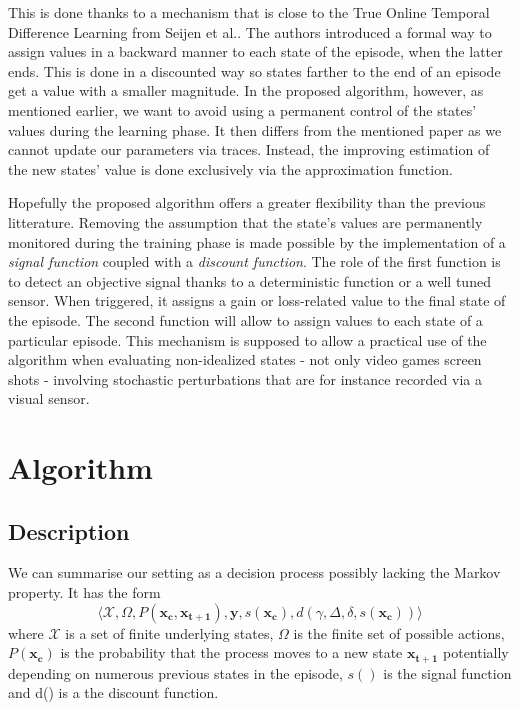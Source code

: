 \documentclass[letterpaper, 10.5 pt, conference]{ieeeconf}
\newcommand{\B}[1]{\mathbf{#1}}
\begin{document}
This is done thanks to a mechanism that is close to the True Online Temporal Difference Learning from Seijen et al.. The authors introduced a formal way to assign values in a backward manner to each state of the episode, when the latter ends. This is done in a discounted way so states farther to the end of an episode get a value with a smaller magnitude. In the proposed algorithm, however, as mentioned earlier, we want to avoid using a permanent control of the states' values during the learning phase. It then differs from the mentioned paper as we cannot update our parameters via traces. Instead, the improving estimation of the new states' value is done exclusively via the approximation function.

Hopefully the proposed algorithm offers a greater flexibility than the previous litterature. Removing the assumption that the state's values are permanently monitored during the training phase is made possible by the implementation of a \textit{signal function} coupled with a \textit{discount function}. The role of the first function is to detect an objective signal thanks to a deterministic function or a well tuned sensor. When triggered, it assigns a gain or loss-related value to the final state of the episode. The second function will allow to assign values to each state of a particular episode. This mechanism is supposed to allow a practical use of the algorithm when evaluating non-idealized states - not only video games screen shots - involving stochastic perturbations that are for instance recorded via a visual sensor. 

\section{Algorithm}

\subsection{Description}

We can summarise our setting as a decision process possibly lacking the Markov property. It has the form
$$\langle \mathcal{X},\Omega, P(\B{x_c},\B{x_{t+1}}), \B{y},s(\B{x_c}),d(\gamma, \Delta, \delta, s(\B{x_c})) \rangle$$
where $\mathcal{X}$ is a set of finite underlying states, $\Omega$ is the finite set of possible actions, $P(\B{x_c})$ is the probability that the process moves to a new state $\B{x_{t+1}}$ potentially depending on numerous previous states in the episode, $s()$ is the signal function and d() is a the discount function.
\end{document}

